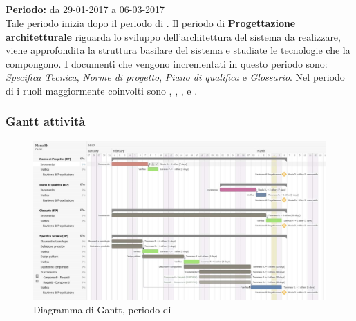 \subsection{\PA{}}
\textbf{Periodo:} da 29-01-2017 a 06-03-2017 \\
Tale periodo inizia dopo il periodo di \AD{}. Il periodo di \textbf{Progettazione architetturale} riguarda lo sviluppo dell'architettura del sistema da realizzare, viene approfondita la struttura basilare del sistema e studiate le tecnologie che la compongono. I documenti che vengono incrementati in questo periodo sono: \textit{Specifica Tecnica}, \textit{Norme di progetto}, \textit{Piano di qualifica} e \textit{Glossario}.
Nel periodo di \PA{} i ruoli maggiormente coinvolti sono \Progettista{}, \Responsabile{}, \Amministratore{}, \Analista{} e \Verificatore{}.
\subsubsection{Gantt attività}
\begin{figure}[H]
	\centering
	\includegraphics[width=15cm]{gantt/Gantt_RP2.png}
	\caption{Diagramma di Gantt, periodo di \PA{}}
\end{figure}

